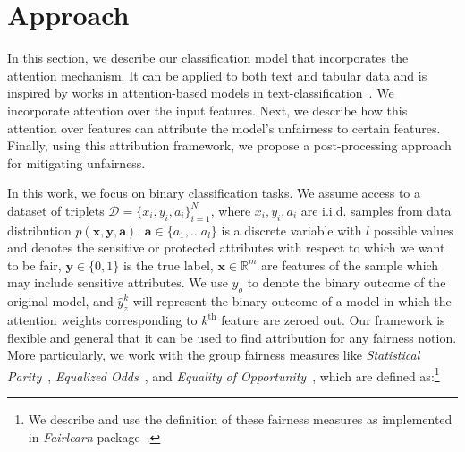 \section{Approach}

In this section, we describe our classification model that incorporates the attention mechanism. It can be applied to both text and tabular data and is inspired by works in attention-based models in text-classification~\cite{zhou-etal-2016-attention}. We incorporate attention over the input features. Next, we describe how this attention over features can attribute the model's unfairness to certain features. Finally, using this attribution framework, we propose a post-processing approach for mitigating unfairness.

In this work, we focus on binary classification tasks. We assume access to a dataset of triplets $\mathcal D = \{x_i , y_i , a_i \}^N_{i=1}$, where $x_i,y_i,a_i$ are i.i.d. samples from data distribution $p(\mathbf x, \mathbf y, \mathbf a)$. $\mathbf a \in \{a_1,\ldots a_l\}$ is a discrete variable with $l$ possible values and denotes the sensitive or protected attributes with respect to which we want to be fair, $\mathbf y\in \{0,1\}$ is the true label, $\mathbf x\in \mathbb{R}^m $ are features of the sample which may include sensitive attributes. We use $\hat y_o$ to denote the binary outcome of the original model, and $\hat y_z^k$ will represent the binary outcome of a model in which the attention weights corresponding to $k^\text{th}$ feature are zeroed out. Our framework is flexible and general that it can be used to find attribution for any fairness notion. More particularly, we work with the group fairness measures like \textit{Statistical Parity}~\cite{Dwork:2012:FTA:2090236.2090255}, \textit{Equalized Odds}~\cite{NIPS2016_9d268236}, and \textit{Equality of Opportunity}~\cite{NIPS2016_9d268236}, which are defined as:\footnote{We describe and use the  definition of these fairness measures as implemented in \textit {Fairlearn }package~\cite{bird2020fairlearn}. } 

